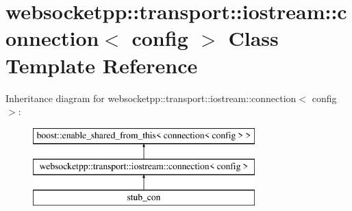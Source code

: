 \hypertarget{classwebsocketpp_1_1transport_1_1iostream_1_1connection}{}\section{websocketpp\+:\+:transport\+:\+:iostream\+:\+:connection$<$ config $>$ Class Template Reference}
\label{classwebsocketpp_1_1transport_1_1iostream_1_1connection}
Inheritance diagram for websocketpp\+:\+:transport\+:\+:iostream\+:\+:connection$<$ config $>$\+:\begin{figure}[H]
\begin{center}
\leavevmode
\includegraphics[height=3.000000cm]{classwebsocketpp_1_1transport_1_1iostream_1_1connection}
\end{center}
\end{figure}
